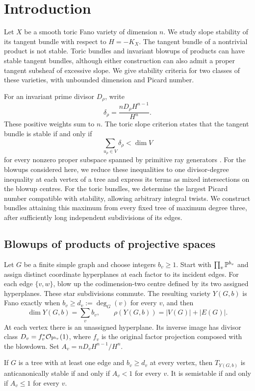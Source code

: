 \section{Introduction}\label{sec:intro}

Let $X$ be a smooth toric Fano variety of dimension $n$. We study slope
stability of its tangent bundle with respect to $H=-K_X$. The tangent
bundle of a nontrivial product is not stable. Toric bundles and invariant
blowups of products can have stable tangent bundles, although either
construction can also admit a proper tangent subsheaf of excessive slope.
We give stability criteria for two classes of these varieties, with
unbounded dimension and Picard number.

For an invariant prime divisor $D_\rho$, write
\[
 \delta_\rho=\frac{nD_\rho H^{n-1}}{H^n}.
\]
These positive weights sum to $n$. The toric slope criterion states that
the tangent bundle is stable if and only if
\[
 \sum_{u_\rho\in V}\delta_\rho<\dim V
\]
for every nonzero proper subspace spanned by primitive ray generators
\cite{Klyachko1990,HeringNillSuess2022}. For the blowups considered here,
we reduce these inequalities to one divisor-degree inequality at each
vertex of a tree and express its terms as mixed intersections on the
blowup centres. For the toric bundles, we determine the largest Picard
number compatible with stability, allowing arbitrary integral twists.
We construct bundles attaining this maximum from every fixed tree of
maximum degree three, after sufficiently long independent subdivisions
of its edges.

\subsection*{Blowups of products of projective spaces}
Let $G$ be a finite simple graph and choose integers $b_v\ge1$. Start
with $\prod_v\mathbb{P}^{b_v}$ and assign distinct coordinate hyperplanes at
each factor to its incident edges. For each edge $\{v,w\}$, blow up
the codimension-two centre defined by its two assigned hyperplanes.
These star subdivisions commute. The resulting variety $Y(G,b)$ is
Fano exactly when $b_v\ge d_v:=\deg_G(v)$ for every $v$, and then
\[
 \dim Y(G,b)=\sum_v b_v,\qquad
 \rho(Y(G,b))=|V(G)|+|E(G)|.
\]
At each vertex there is an unassigned hyperplane. Its inverse image
has divisor class $D_v=f_v^*\mathcal O_{\mathbb{P}^{b_v}}(1)$, where $f_v$
is the original factor projection composed with the blowdown. Set
$A_v=nD_vH^{n-1}/H^n$.

\begin{theorem}\label{thm:mixed-intro}
If $G$ is a tree with at least one edge and $b_v\ge d_v$ at every
vertex, then $T_{Y(G,b)}$ is anticanonically stable if and only if
$A_v<1$ for every $v$. It is semistable if and only if $A_v\le1$
for every $v$.
\end{theorem}


